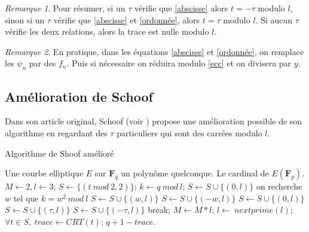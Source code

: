 \documentclass{article}%
\theoremstyle{plain}
\theoremstyle{definition}
\theoremstyle{plain}
\theoremstyle{plain}
\theoremstyle{remark}
\newtheorem*{remarque}{Remarque}
\newcommand\fq{\mathbf{F}_{q}}
\begin{document}
\begin{remarque}
Pour résumer, si un $\tau$ vérifie que \eqref{abscisse} alors $t=-\tau$ modulo $l$, sinon si un $\tau$ vérifie que \eqref{abscisse} et \eqref{ordonnée}, alors $t=\tau$ modulo $l$. Si aucun $\tau$ vérifie les deux relations, alors la trace est nulle modulo $l$.
\end{remarque}

\begin{remarque}
En pratique, dans les équations \eqref{abscisse} et \eqref{ordonnée}, on remplace les $\psi_{n}$ par des $f_{n}$. Puis si nécessaire on réduira modulo \eqref{ecc} et on divisera par $y$.
\end{remarque}

\subsection{Amélioration de Schoof}

Dans son article original, Schoof (voir \cite{ref1}) propose une amélioration possible de son algorithme en regardant des $\tau$ particuliers qui sont des carrées modulo $l$.

\begin{algorithm}[H]
\caption{Algorithme de Shoof amélioré}
\label{schoof2}
\begin{algorithmic} 
\REQUIRE Une courbe elliptique $E$ sur $\fq$ un polynôme quelconque.
\ENSURE Le cardinal de $E(\mathbf{F}_{p})$.
\STATE $M\leftarrow 2, l\leftarrow 3$;
\STATE $S\leftarrow \{(t\ mod\ 2, 2)\}$; 
    \STATE $k\leftarrow q\ mod\ l$;	
            \STATE $S\leftarrow S\cup \{(0, l)\}$
            \ELSE
                \STATE on recherche $w$ tel que $k=w^{2}\ mod\ l$
                    \STATE $S\leftarrow S\cup \{(w, l)\}$ \OR $S\leftarrow S\cup \{(-w, l)\}$ 
                \ELSE
                    \STATE $S\leftarrow S\cup \{(0, l)\}$
                \ENDIF
            \ENDIF
    \ELSE
                \STATE $S\leftarrow S\cup \{(\tau, l)\}$ \OR $S\leftarrow S\cup \{(-\tau, l)\}$ 
                \STATE break;
            \ENDIF
        \ENDFOR
    \ENDIF
    \STATE $M\leftarrow M*l$;
    \STATE $l\leftarrow\ nextprime(l)$; 	
\ENDWHILE
\STATE $\forall t\in S,\ trace\leftarrow CRT(t)$; 
\RETURN $q + 1 - trace$.
\end{algorithmic}
\end{algorithm}
\end{document}

